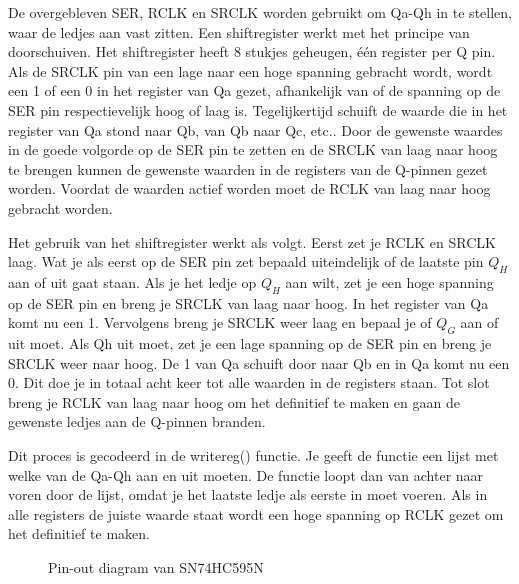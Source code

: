 	De overgebleven SER, RCLK en SRCLK worden gebruikt om Qa-Qh in te stellen, waar de ledjes aan vast zitten. Een shiftregister werkt met het principe van doorschuiven. Het shiftregister heeft 8 stukjes geheugen, \'e\'en register per Q pin. Als de SRCLK pin van een lage naar een hoge spanning gebracht wordt, wordt een 1 of een 0 in het register van Qa gezet, afhankelijk van of de spanning op de SER pin respectievelijk hoog of laag is. Tegelijkertijd schuift de waarde die in het register van Qa stond naar Qb, van Qb naar Qc, etc.. Door de gewenste waardes in de goede volgorde op de SER pin te zetten en de SRCLK van laag naar hoog te brengen kunnen de gewenste waarden in de registers van de Q-pinnen gezet worden. Voordat de waarden actief worden moet de RCLK van laag naar hoog gebracht worden.
	
	Het gebruik van het shiftregister werkt als volgt. Eerst zet je RCLK en SRCLK laag. Wat je als eerst op de SER pin zet bepaald uiteindelijk of de laatste pin $Q_H$ aan of uit gaat staan. Als je het ledje op $Q_H$ aan wilt, zet je een hoge spanning op de SER pin en breng je SRCLK van laag naar hoog. In het register van Qa komt nu een 1. Vervolgens breng je SRCLK weer laag en bepaal je of $Q_G$ aan of uit moet. Als Qh uit moet, zet je een lage spanning op de SER pin en breng je SRCLK weer naar hoog. De 1 van Qa schuift door naar Qb en in Qa komt nu een 0. Dit doe je in totaal acht keer tot alle waarden in de registers staan. Tot slot breng je RCLK van laag naar hoog om het definitief te maken en gaan de gewenste ledjes aan de Q-pinnen branden.
	
	Dit proces is gecodeerd in de writereg() functie. Je geeft de functie een lijst met welke van de Qa-Qh aan en uit moeten. De functie loopt dan van achter naar voren door de lijst, omdat je het laatste ledje als eerste in moet voeren. Als in alle registers de juiste waarde staat wordt een hoge spanning op RCLK gezet om het definitief te maken.


	\begin{figure}[!htb]
		\caption{Pin-out diagram van SN74HC595N}
		\label{fig:SN74HC595N}
	\end{figure}

